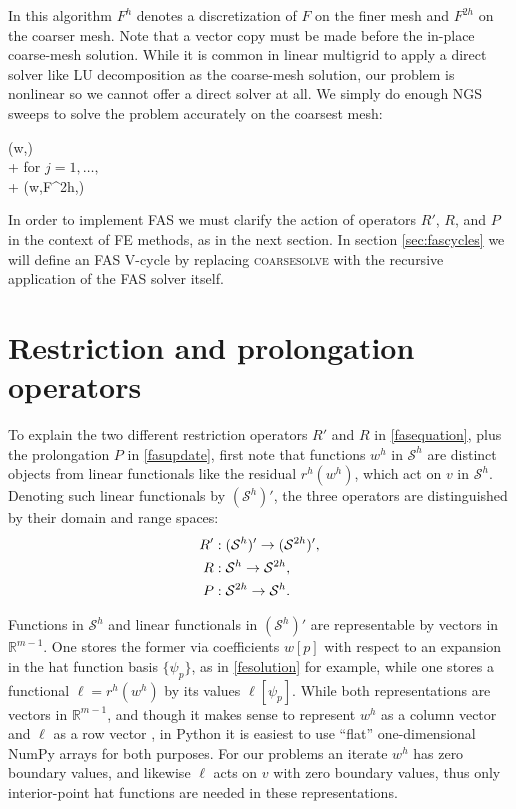 \documentclass[letterpaper,final,12pt,reqno]{amsart}
\newcommand{\RR}{\mathbb{R}}
\begin{document}
In this algorithm $F^h$ denotes a discretization of $F$ on the finer mesh and $F^{2h}$ on the coarser mesh.  Note that a vector copy must be made before the in-place coarse-mesh solution.  While it is common in linear multigrid \cite{Briggsetal2000,Bueler2021,Trottenbergetal2001} to apply a direct solver like LU decomposition as the coarse-mesh solution, our problem is nonlinear so we cannot offer a direct solver at all.  We simply do enough NGS sweeps to solve the problem accurately on the coarsest mesh:

\begin{pseudo*}
(w,\ell)\text{:} \\+
    for $j=1,\dots,$ \\+
        (w,F^{2h},\ell)
\end{pseudo*}

In order to implement FAS we must clarify the action of operators $R'$, $R$, and $P$ in the context of FE methods, as in the next section.  In section \ref{sec:fascycles} we will define an FAS V-cycle by replacing \textsc{coarsesolve} with the recursive application of the FAS solver itself.


\section{Restriction and prolongation operators} \label{sec:restrictionprolongation}

To explain the two different restriction operators $R'$ and $R$ in \eqref{fasequation}, plus the prolongation $P$ in \eqref{fasupdate}, first note that functions $w^h$ in $\mathcal{S}^h$ are distinct objects from linear functionals like the residual $r^h(w^h)$, which act on $v$ in $\mathcal{S}^h$.  Denoting such linear functionals by $(\mathcal{S}^h)'$, the three operators are distinguished by their domain and range spaces:
\begin{align}
  R' &: (\mathcal{S}^h)' \to (\mathcal{S}^{2h})', \label{rpoperators} \\
  R  &: \mathcal{S}^h \to \mathcal{S}^{2h}, \notag \\
  P  &: \mathcal{S}^{2h} \to \mathcal{S}^h. \notag
\end{align}

Functions in $\mathcal{S}^h$ and linear functionals in $(\mathcal{S}^h)'$ are representable by vectors in $\RR^{m-1}$.  One stores the former via coefficients $w[p]$ with respect to an expansion in the hat function basis $\{\psi_p\}$, as in \eqref{fesolution} for example, while one stores a functional $\ell=r^h(w^h)$ by its values $\ell[\psi_p]$.  While both representations are vectors in $\RR^{m-1}$, and though it makes sense to represent $w^h$ as a column vector and $\ell$ as a row vector \cite{TrefethenBau1997}, in Python it is easiest to use ``flat'' one-dimensional NumPy arrays for both purposes.  For our problems an iterate $w^h$ has zero boundary values, and likewise $\ell$ acts on $v$ with zero boundary values, thus only interior-point hat functions are needed in these representations.
\end{document}
